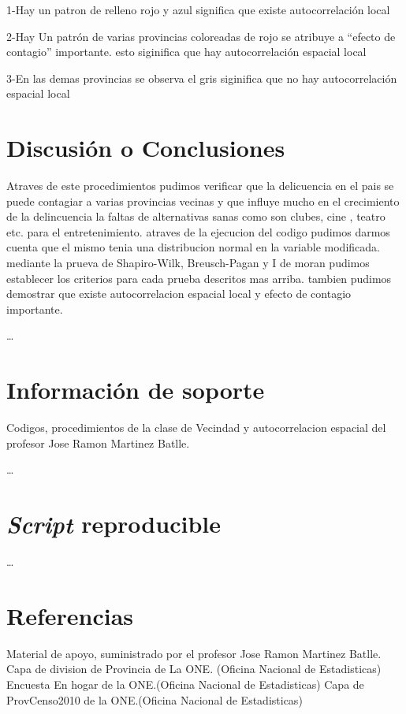 \documentclass[11pt,]{article}
\begin{document}
1-Hay un patron de relleno rojo y azul significa que existe
autocorrelación local

2-Hay Un patrón de varias provincias coloreadas de rojo se atribuye a
``efecto de contagio'' importante. esto siginifica que hay
autocorrelación espacial local

3-En las demas provincias se observa el gris siginifica que no hay
autocorrelación espacial local

\section{Discusión o Conclusiones}\label{discusiuxf3n-o-conclusiones}

Atraves de este procedimientos pudimos verificar que la delicuencia en
el pais se puede contagiar a varias provincias vecinas y que influye
mucho en el crecimiento de la delincuencia la faltas de alternativas
sanas como son clubes, cine , teatro etc. para el entretenimiento.
atraves de la ejecucion del codigo pudimos darmos cuenta que el mismo
tenia una distribucion normal en la variable modificada. mediante la
prueva de Shapiro-Wilk, Breusch-Pagan y I de moran pudimos establecer
los criterios para cada prueba descritos mas arriba. tambien pudimos
demostrar que existe autocorrelacion espacial local y efecto de contagio
importante.

\ldots

\section{Información de soporte}\label{informaciuxf3n-de-soporte}

Codigos, procedimientos de la clase de Vecindad y autocorrelacion
espacial del profesor Jose Ramon Martinez Batlle.

\ldots

\section{\texorpdfstring{\emph{Script}
reproducible}{Script reproducible}}\label{script-reproducible}

\ldots

\section{Referencias}\label{referencias}

Material de apoyo, suministrado por el profesor Jose Ramon Martinez
Batlle. Capa de division de Provincia de La ONE. (Oficina Nacional de
Estadisticas) Encuesta En hogar de la ONE.(Oficina Nacional de
Estadisticas) Capa de ProvCenso2010 de la ONE.(Oficina Nacional de
Estadisticas)
\end{document}
